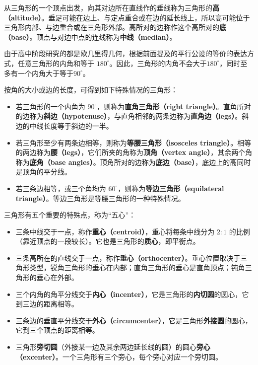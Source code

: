 从三角形的一个顶点出发，向其对边所在直线作的垂线称为三角形的\textbf{高（altitude）}。垂足可能在边上、与定点重合或在边的延长线上，所以高可能位于三角形内部、与边重合或在三角形外部。高所对的边称作这个高所对的\textbf{底（base）}。顶点与对边中点的连线称为\textbf{中线（median）}。

由于高中阶段研究的都是欧几里得几何，根据前面提及的平行公设的等价的表达方式，任意三角形的内角和等于 $180^\circ$。因此，三角形的内角不会大于$180^\circ$，同时至多有一个内角大于等于$90^\circ$。

按角的大小或边的长度，可得到如下特殊情况的三角形：

\begin{itemize}
\item 若三角形的一个内角为 $90^\circ$，则称为\textbf{直角三角形（right triangle）}。直角所对的边称为\textbf{斜边（hypotenuse）}，与直角相邻的两条边称为\textbf{直角边（legs）}。斜边的中线长度等于斜边的一半。

\item 若三角形至少有两条边相等，则称为\textbf{等腰三角形（isosceles triangle）}。相等的两边称为\textbf{腰（legs）}，它们所夹的角称为\textbf{顶角（vertex angle）}，其余两个角称为\textbf{底角（base angles）}。顶角所对的边称为\textbf{底边（base）}，底边上的高同时是顶角的平分线。

\item 若三条边相等，或三个角均为 $60^\circ$，则称为\textbf{等边三角形（equilateral triangle）}。等边三角形是等腰三角形的一种特殊情况。
\end{itemize}

三角形有五个重要的特殊点，称为“五心”：
\begin{itemize}
\item 三条中线交于一点，称作\textbf{重心（centroid）}，重心将每条中线分为 $2:1$ 的比例（靠近顶点的一段较长）。它也是三角形的\textbf{质心}，即平衡点。
\item 三条高所在的直线交于一点，称作\textbf{垂心（orthocenter）}。垂心位置取决于三角形类型，锐角三角形的垂心在内部；直角三角形的垂心是直角顶点；钝角三角形的垂心在外部。
\item 三个内角的角平分线交于\textbf{内心（incenter）}，它是三角形的\textbf{内切圆}的圆心，它到三边的距离相等。
\item 三条边的垂直平分线交于\textbf{外心（circumcenter）}，它是三角形\textbf{外接圆}的圆心，它到三个顶点的距离相等。
\item 三角形\textbf{旁切圆}（外接某一边及其余两边延长线的圆）的圆心\textbf{旁心（excenter）}。一个三角形有三个旁心，每个旁心对应一个旁切圆。
\end{itemize}

